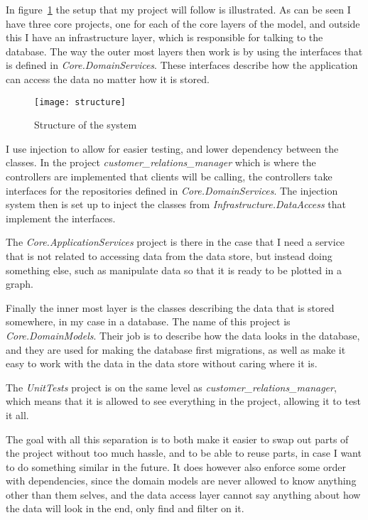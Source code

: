 In figure~\ref{fig:structure} the setup that my project will follow is
illustrated. As can be seen I have three core projects, one for each of the core
layers of the model, and outside this I have an infrastructure layer, which is
responsible for talking to the database. The way the outer most layers then work
is by using the interfaces that is defined in \textit{Core.DomainServices}.
These interfaces describe how the application can access the data no matter how it is
stored. 

\begin{figure}[h]
  \centering
  \texttt{[image: structure]}
  \caption{Structure of the system}
  \label{fig:structure}
\end{figure}

I use injection to allow for easier testing, and lower dependency between the
classes. In the project \textit{customer\_relations\_manager}
which is where the controllers are implemented that clients will be calling, the
controllers take interfaces for the repositories defined in
\textit{Core.DomainServices}. The injection system then is set up to inject the
classes from \textit{Infrastructure.DataAccess} that implement the interfaces. 

The \textit{Core.ApplicationServices} project is there in the case that I need a
service that is not related to accessing data from the data store, but instead
doing something else, such as manipulate data so that it is ready to be plotted
in a graph.

Finally the inner most layer is the classes describing the data that is stored
somewhere, in my case in a database. The name of this project is
\textit{Core.DomainModels}. Their job is to describe how the data looks in the
database, and they are used for making the database first migrations, as well as
make it easy to work with the data in the data store without caring where it is.

The \textit{UnitTests} project is on the same level as
\textit{customer\_relations\_manager}, which means that it is allowed to see
everything in the project, allowing it to test it all. 

The goal with all this separation is to both make it easier to swap out parts of
the project without too much hassle, and to be able to reuse parts, in case I
want to do something similar in the future. It does however also enforce some
order with dependencies, since the domain models are never allowed to know
anything other than them selves, and the data access layer cannot say anything
about how the data will look in the end, only find and filter on it. 

